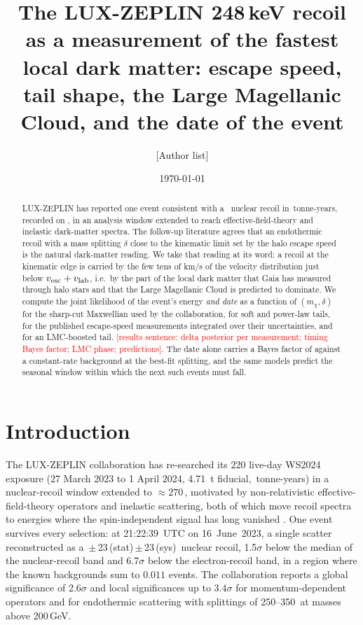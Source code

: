 \documentclass[11pt]{article}
\title{The LUX-ZEPLIN 248\,keV recoil as a measurement of the fastest local dark matter:
escape speed, tail shape, the Large Magellanic Cloud, and the date of the event}
\author{[Author list]}
\date{\today}
\newcommand{\TODO}[1]{\textcolor{red}{[#1]}}
\newcommand{\vesc}{v_{\rm esc}\xspace}
\newcommand{\vlab}{v_{\rm lab}\xspace}
\newcommand{\keV}{\,\mathrm{keV}\xspace}
\begin{document}
\maketitle

\begin{abstract}
LUX-ZEPLIN has reported one event consistent with a \EventEnergy\keV nuclear recoil in
\Exposure\,tonne-years, recorded on \EventDate, in an analysis window extended to
reach effective-field-theory and inelastic dark-matter spectra.  The follow-up
literature agrees that an endothermic recoil with a mass splitting $\delta$ close to
the kinematic limit set by the halo escape speed is the natural dark-matter reading.
We take that reading at its word: a recoil at the kinematic edge is carried by the
few tens of \si{km/s} of the velocity distribution just below $\vesc+\vlab$, i.e.\ by
the part of the local dark matter that Gaia has measured through halo stars and
that the Large Magellanic Cloud is predicted to dominate.  We compute the joint
likelihood of the event's energy \emph{and date} as a function of $(m_\chi,\delta)$
for the sharp-cut Maxwellian used by the collaboration, for soft and power-law
tails, for the published escape-speed measurements integrated over their
uncertainties, and for an LMC-boosted tail.  \TODO{results sentence: delta
posterior per measurement; timing Bayes factor; LMC phase; predictions}.  The
date alone carries a Bayes factor of \TimingBFbest against a constant-rate
background at the best-fit splitting, and the same models predict the seasonal
window within which the next such events must fall.
\end{abstract}

\section{Introduction}
The LUX-ZEPLIN collaboration has re-searched its 220 live-day WS2024 exposure
(27 March 2023 to 1 April 2024, 4.71~t fiducial, \Exposure\,tonne-years) in a
nuclear-recoil window extended to $\approx270$\keV, motivated by non-relativistic
effective-field-theory operators and inelastic scattering, both of which move recoil
spectra to energies where the spin-independent signal has long vanished
\citep{LZ2026extended}.  One event survives every selection: at 21:22:39~UTC on
16~June~2023, a single scatter reconstructed as a \EventEnergy\,$\pm$\,23\,(stat)\,$\pm$\,23\,(sys)\keV
nuclear recoil, 1.5$\sigma$ below the median of the nuclear-recoil band and 6.7$\sigma$
below the electron-recoil band, in a region where the known backgrounds sum to
$0.011$ events.  The collaboration reports a global significance of 2.6$\sigma$ and
local significances up to 3.4$\sigma$ for momentum-dependent operators and for
endothermic scattering with splittings of 250--350\keV at masses above 200\,GeV.
\end{document}
